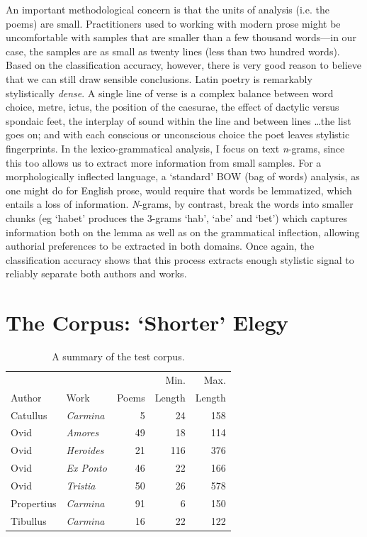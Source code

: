 \documentclass[twocolumn, switch, a4paper]{article} %
\begin{document}
An important methodological concern is that the units of analysis (i.e. the
poems) are small. Practitioners used to working with modern prose might be
uncomfortable with samples that are smaller than a few thousand words---in our
case, the samples are as small as twenty lines (less than two hundred words).
Based on the classification accuracy, however, there is very good reason to
believe that we can still draw sensible conclusions. Latin poetry is
remarkably stylistically \emph{dense}. A single line of verse is a complex
balance between word choice, metre, ictus, the position of the caesurae, the
effect of dactylic versus spondaic feet, the interplay of sound within the
line and between lines \dots the list goes on; and with each conscious or
unconscious choice the poet leaves stylistic fingerprints. In the
lexico-grammatical analysis, I focus on text \emph{n}-grams, since this too
allows us to extract more information from small samples. For a
morphologically inflected language, a `standard' BOW (bag of words) analysis,
as one might do for English prose, would require that words be lemmatized,
which entails a loss of information. \emph{N}-grams, by contrast, break the
words into smaller chunks (eg `habet' produces the 3-grams `hab', `abe' and
`bet') which captures information both on the lemma as well as on the
grammatical inflection, allowing authorial preferences to be extracted in both
domains. Once again, the classification accuracy shows that this process
extracts enough stylistic signal to reliably separate both authors and works.

\section{The Corpus: `Shorter' Elegy}

\begin{table}
\caption{A summary of the test corpus.}
\label{tab:corpus}
\centering
\begin{tabular}{llrrr}
            &                  &       &   Min.  &  Max. \\
     Author &   Work           & Poems & Length  & Length \\
\midrule
   Catullus &  \emph{Carmina}  &     5 &   24 &  158 \\
       Ovid &  \emph{Amores}   &    49 &   18 &  114 \\
       Ovid &  \emph{Heroides} &    21 &  116 &  376 \\
       Ovid &  \emph{Ex Ponto} &    46 &   22 &  166 \\
       Ovid &  \emph{Tristia}  &    50 &   26 &  578 \\
 Propertius &  \emph{Carmina}  &    91 &    6 &  150 \\
   Tibullus &  \emph{Carmina}  &    16 &   22 &  122 \\
\bottomrule
\end{tabular}
\end{table}
\end{document}
